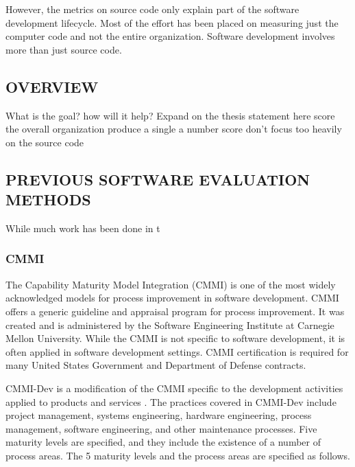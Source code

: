 \documentclass[SDSUThesis.tex]{subfiles}
\begin{document}
    However, the metrics on source code only explain part of the 
    software development lifecycle.  
    Most of the effort has been placed on measuring just the 
    computer code and not the entire organization.  Software
    development involves more than just source code.

\subsection{OVERVIEW}

    What is the goal? how will it help?  Expand on the thesis statement here
    score the overall organization
    produce a single a number score
    don't focus too heavily on the source code


\subsection{PREVIOUS SOFTWARE EVALUATION METHODS}

While much work has been done in t


\subsubsection{CMMI}
    The Capability Maturity Model Integration (CMMI) is one of the most 
    widely acknowledged models for process 
    improvement in software development.  CMMI offers a generic guideline 
    and appraisal program for process 
    improvement.  It was created and is administered by the Software Engineering Institute at
    Carnegie Mellon University. While the CMMI is not specific to software development,
    it is often applied in software development settings.
    CMMI certification is required for many United States Government 
    and Department of Defense contracts. 
    
    CMMI-Dev is a modification of the CMMI specific to the development activities applied to products
    and services \cite{CMMI}.  The practices covered in CMMI-Dev include project management, 
    systems engineering, hardware engineering, process management, software engineering, and 
    other maintenance processes.  Five maturity levels are specified, and they include the 
    existence of a number of process areas.  The 5 maturity levels and the process areas are
    specified as follows.
\end{document}
